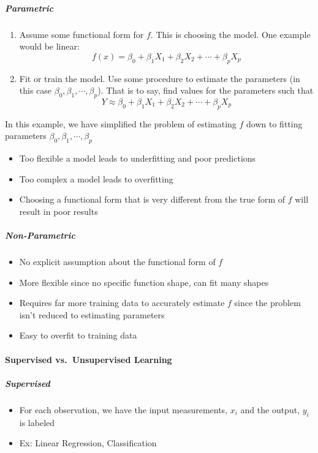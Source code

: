 \subparagraph{Parametric}\label{parametric}

\begin{enumerate}
\def\labelenumi{\arabic{enumi}.}
\tightlist
\item
  Assume some functional form for \(f\). This is choosing the model. One
  example would be linear:
  \[f(x) = \beta_0 + \beta_1 X_1 + \beta_2 X_2 + \cdots + \beta_p X_p\] 
  \item
  Fit or train the model. Use some procedure to estimate the parameters
  (in this case \(\beta_0, \beta_1, \cdots, \beta_p\)). That is to say,
  find values for the parameters such that
  \[Y \approx  \beta_0 + \beta_1 X_1 + \beta_2 X_2 + \cdots + \beta_p X_p\]
\end{enumerate}


In this example, we have simplified the problem of estimating \(f\) down to fitting parameters \(\beta_0, \beta_1, \cdots, \beta_p\)
\begin{itemize}
    \tightlist
    \item Too flexible a model leads to underfitting and poor predictions
    \item Too complex a model leads to overfitting
    \item Choosing a functional form that is very different from the true form of \(f\) will result in poor results
\end{itemize}

\subparagraph{Non-Parametric}
\begin{itemize}
    \tightlist
    \item No explicit assumption about the    functional form of \(f\)
    \item More flexible since no specific function shape, can fit many shapes
    \item Requires far more training data to     accurately estimate \(f\) since the problem isn't reduced to estimating    parameters 
    \item Easy to overfit to training data
\end{itemize}

\paragraph{Supervised vs.~Unsupervised Learning}\label{supervised-vs.-unsupervised-learning}

\subparagraph{Supervised}

\begin{itemize}
\tightlist
\item  For each observation, we have the input measurements, \(x_i\) and the  output, \(y_i\) is labeled
\item  Ex: Linear Regression, Classification
  \end{itemize}
  
